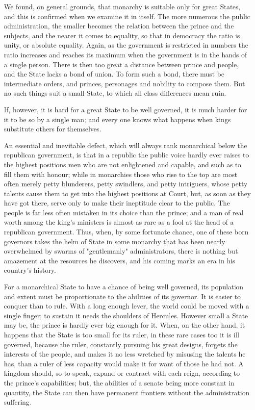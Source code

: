 \documentclass[12pt]{book}
\begin{document}
We found, on general grounds, that monarchy is suitable only for great States, and this is confirmed when we examine it in itself. The more numerous the public administration, the smaller becomes the relation between the prince and the subjects, and the nearer it comes to equality, so that in democracy the ratio is unity, or absolute equality. Again, as the government is restricted in numbers the ratio increases and reaches its maximum when the government is in the hands of a single person. There is then too great a distance between prince and people, and the State lacks a bond of union. To form such a bond, there must be intermediate orders, and princes, personages and nobility to compose them. But no such things suit a small State, to which all class differences mean ruin.

If, however, it is hard for a great State to be well governed, it is much harder for it to be so by a single man; and every one knows what happens when kings substitute others for themselves.

An essential and inevitable defect, which will always rank monarchical below the republican government, is that in a republic the public voice hardly ever raises to the highest positions men who are not enlightened and capable, and such as to fill them with honour; while in monarchies those who rise to the top are most often merely petty blunderers, petty swindlers, and petty intriguers, whose petty talents cause them to get into the highest positions at Court, but, as soon as they have got there, serve only to make their ineptitude clear to the public. The people is far less often mistaken in its choice than the prince; and a man of real worth among the king's ministers is almost as rare as a fool at the head of a republican government. Thus, when, by some fortunate chance, one of these born governors takes the helm of State in some monarchy that has been nearly overwhelmed by swarms of "gentlemanly" administrators, there is nothing but amazement at the resources he discovers, and his coming marks an era in his country's history.

For a monarchical State to have a chance of being well governed, its population and extent must be proportionate to the abilities of its governor. It is easier to conquer than to rule. With a long enough lever, the world could be moved with a single finger; to sustain it needs the shoulders of Hercules. However small a State may be, the prince is hardly ever big enough for it. When, on the other hand, it happens that the State is too small for its ruler, in these rare cases too it is ill governed, because the ruler, constantly pursuing his great designs, forgets the interests of the people, and makes it no less wretched by misusing the talents he has, than a ruler of less capacity would make it for want of those he had not. A kingdom should, so to speak, expand or contract with each reign, according to the prince's capabilities; but, the abilities of a senate being more constant in quantity, the State can then have permanent frontiers without the administration suffering.
\end{document}
